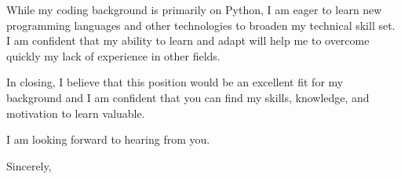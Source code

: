 \documentclass[letter,10pt]{letter}
\begin{document}
\begin{letter}{
}
While my coding background is primarily on Python, I am eager to learn new programming languages and other technologies to broaden my technical skill set. 
I am confident that my ability to learn and adapt will help me to overcome quickly my lack of experience in other fields.


In closing, 
I believe that this position would be an excellent fit for my background and I am confident that you can find my skills, knowledge, and motivation to learn valuable.

I am looking forward to hearing from you.


\closing{Sincerely,}



\end{letter}
\end{document}
